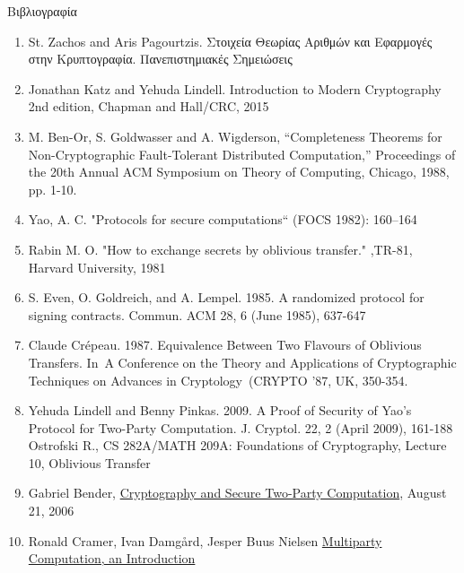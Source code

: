 \documentclass{beamer}
\begin{document}
\begin{frame}[allowframebreaks]{Βιβλιογραφία}

\begin{tiny}
\begin{enumerate}
\item St. Zachos and Aris Pagourtzis. Στοιχεία Θεωρίας Αριθμών και Εφαρμογές στην Κρυπτογραφία. Πανεπιστημιακές Σημειώσεις
\item Jonathan Katz and Yehuda Lindell. Introduction to Modern Cryptography 2nd edition,  Chapman and Hall/CRC, 2015
\item M. Ben-Or, S. Goldwasser and A. Wigderson, “Completeness Theorems for Non-Cryptographic Fault-Tolerant Distributed Computation,” Proceedings of the 20th Annual ACM Symposium on Theory of Computing, Chicago, 1988, pp. 1-10.
\item Yao, A. C.  "Protocols for secure computations“ (FOCS 1982): 160–164
\item Rabin M. O. "How to exchange secrets by oblivious transfer." ,TR-81, Harvard University, 1981
\item S. Even, O. Goldreich, and A. Lempel. 1985. A randomized protocol for signing contracts. Commun. ACM 28, 6 (June 1985), 637-647
\item Claude Crépeau. 1987. Equivalence Between Two Flavours of Oblivious Transfers. In A Conference on the Theory and Applications of Cryptographic Techniques on Advances in Cryptology (CRYPTO '87, UK, 350-354.
\item Yehuda Lindell and Benny Pinkas. 2009. A Proof of Security of Yao’s Protocol for Two-Party Computation. J. Cryptol. 22, 2 (April 2009), 161-188
Ostrofski R., CS 282A/MATH 209A: Foundations of Cryptography, Lecture 10, Oblivious Transfer
\item Gabriel Bender, \href{http://www.math.uchicago.edu/~may/VIGRE/VIGRE2006/PAPERS/Bender.pdf}{Cryptography and Secure Two-Party Computation}, August 21, 2006
\item Ronald Cramer, Ivan Damgård, Jesper Buus Nielsen \href{https://pdfs.semanticscholar.org/6ae2/38ab990dd0c97fa972dc6087da7aaece4279.pdf}{Multiparty Computation, an Introduction} 
\end{enumerate}
\end{tiny}
\end{frame}
\end{document}
